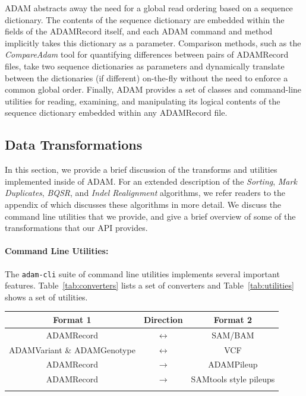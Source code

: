 \documentclass{bioinfo}
\begin{document}
ADAM abstracts away the need for a global read ordering based on a sequence dictionary. 
The contents of the sequence dictionary are embedded within the fields of the ADAMRecord itself, and each ADAM command and method implicitly takes this dictionary as a parameter.
Comparison methods, such as the \emph{CompareAdam} tool for quantifying differences between pairs of ADAMRecord files, take two sequence dictionaries as parameters and dynamically translate between the dictionaries (if different) on-the-fly without the need to enforce a common global order.
Finally, ADAM provides a set of classes and command-line utilities for reading, examining, and manipulating its logical contents of the sequence dictionary embedded within any ADAMRecord file.

\subsection{Data Transformations}
\label{sec:data-transformations}

In this section, we provide a brief discussion of the transforms and utilities implemented inside of ADAM. For an extended description of the \textit{Sorting}, \textit{Mark
Duplicates}, \textit{BQSR}, and \textit{Indel Realignment} algorithms, we refer readers to the appendix of \citet{massie13} which discusses these algorithms in more detail.
We discuss the command line utilities that we provide, and give a brief overview of some of the transformations that our API provides.

\paragraph{Command Line Utilities:}
\label{sec:command-line-utilities}

The \texttt{adam-cli} suite of command line utilities implements several important features. Table~\ref{tab:converters} lists a set of converters
and Table~\ref{tab:utilities} shows a set of utilities.

\begin{table}[h]
{\begin{tabular}{ c c c }
\toprule
\bf Format 1 & \bf Direction & \bf Format 2 \\
\midrule
ADAMRecord & $\leftrightarrow$ & SAM/BAM \\
ADAMVariant \& ADAMGenotype & $\leftrightarrow$ & VCF \\
ADAMRecord & $\rightarrow$ & ADAMPileup \\
ADAMRecord & $\rightarrow$ & SAMtools style pileups \\
\botrule
\end{tabular}}{}
\end{table}
\end{document}
